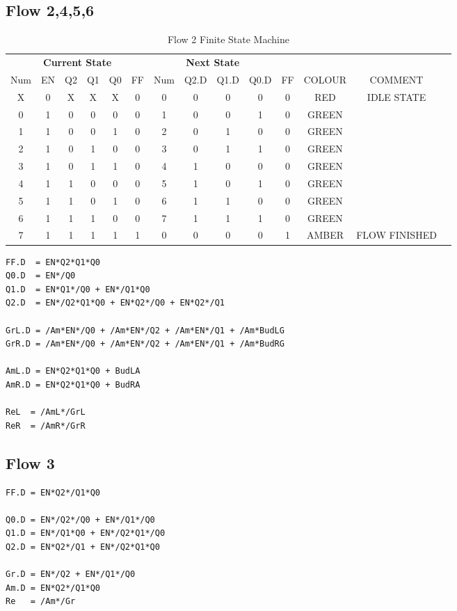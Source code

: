 \subsection{Flow 2,4,5,6}
\label{subsec:F2456cpc}

\begin{table*}
\begin{tabularx}{\linewidth}{ c c c c c c | c c c c c | c c X}
  \multicolumn{6}{c|}{\textbf{Current State}} & \multicolumn{4}{c}{\textbf{Next State}} & & \\
  Num & EN & Q2 & Q1 & Q0 & FF & Num & Q2.D & Q1.D & Q0.D & FF & COLOUR & COMMENT \\ \hline 
    X &  0 &  X &  X &  X &  0 &   0 &    0 &    0 &    0 &  0 & RED    & IDLE STATE \\
    0 &  1 &  0 &  0 &  0 &  0 &   1 &    0 &    0 &    1 &  0 & GREEN  &  \\
    1 &  1 &  0 &  0 &  1 &  0 &   2 &    0 &    1 &    0 &  0 & GREEN  &  \\
    2 &  1 &  0 &  1 &  0 &  0 &   3 &    0 &    1 &    1 &  0 & GREEN  &  \\
    3 &  1 &  0 &  1 &  1 &  0 &   4 &    1 &    0 &    0 &  0 & GREEN  &  \\
    4 &  1 &  1 &  0 &  0 &  0 &   5 &    1 &    0 &    1 &  0 & GREEN  &  \\
    5 &  1 &  1 &  0 &  1 &  0 &   6 &    1 &    1 &    0 &  0 & GREEN  &  \\
    6 &  1 &  1 &  1 &  0 &  0 &   7 &    1 &    1 &    1 &  0 & GREEN  &  \\
    7 &  1 &  1 &  1 &  1 &  1 &   0 &    0 &    0 &    0 &  1 & AMBER  & FLOW FINISHED \\
  \end{tabularx}
\caption{Flow 2 Finite State Machine}
\label{tab:F2456sm}
\end{table*}

\begin{lstlisting}
FF.D  = EN*Q2*Q1*Q0
Q0.D  = EN*/Q0
Q1.D  = EN*Q1*/Q0 + EN*/Q1*Q0
Q2.D  = EN*/Q2*Q1*Q0 + EN*Q2*/Q0 + EN*Q2*/Q1

GrL.D = /Am*EN*/Q0 + /Am*EN*/Q2 + /Am*EN*/Q1 + /Am*BudLG
GrR.D = /Am*EN*/Q0 + /Am*EN*/Q2 + /Am*EN*/Q1 + /Am*BudRG
  
AmL.D = EN*Q2*Q1*Q0 + BudLA
AmR.D = EN*Q2*Q1*Q0 + BudRA
 
ReL  = /AmL*/GrL
ReR  = /AmR*/GrR
\end{lstlisting}

\subsection{Flow 3}
\label{subsec:F3cpc}
\begin{lstlisting}
FF.D = EN*Q2*/Q1*Q0

Q0.D = EN*/Q2*/Q0 + EN*/Q1*/Q0
Q1.D = EN*/Q1*Q0 + EN*/Q2*Q1*/Q0
Q2.D = EN*Q2*/Q1 + EN*/Q2*Q1*Q0

Gr.D = EN*/Q2 + EN*/Q1*/Q0
Am.D = EN*Q2*/Q1*Q0
Re   = /Am*/Gr
\end{lstlisting}